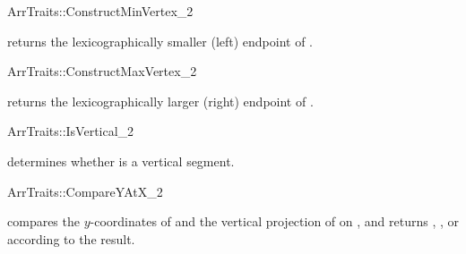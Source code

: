 \ccRefPageBegin
\begin{ccRefConcept}{ArrTraits::ConstructMinVertex_2}

\ccHasModels{}

  {returns the lexicographically smaller (left) endpoint of .}
\end{ccRefConcept}
\ccRefPageEnd

\ccRefPageBegin
\begin{ccRefConcept}{ArrTraits::ConstructMaxVertex_2}

\ccHasModels{}

  {returns the lexicographically larger (right) endpoint of .}
\end{ccRefConcept}
\ccRefPageEnd

\ccRefPageBegin
\begin{ccRefConcept}{ArrTraits::IsVertical_2}

\ccHasModels{}

  {determines whether  is a vertical segment.}
\end{ccRefConcept}
\ccRefPageEnd

\ccRefPageBegin
\begin{ccRefConcept}{ArrTraits::CompareYAtX_2}

\ccHasModels{}

  {compares the $y$-coordinates of  and the vertical 
  projection of  on , and returns , ,
  or  according to the result.}
\end{ccRefConcept}
\ccRefPageEnd

